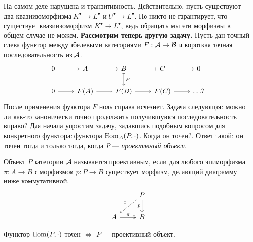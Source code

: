 \documentclass[../hw_main.tex]{subfiles}
\begin{document}
На самом деле нарушена и транзитивность. Действительно, пусть существуют два квазиизоморфизма $K^\bullet \to L^\bullet$ и $U^\bullet \to L^\bullet$. Но никто не гарантирует, что существует квазиизоморфизм $K^\bullet\to L^\bullet$, ведь обращать мы эти морфизмы в общем случае не можем.
\textbf{Рассмотрим теперь другую задачу.} Пусть дан точный слева функтор между абелевыми категориями $F:\mathcal{A} \to \mathcal{B}$ и короткая точная последовательность из $\mathcal{A}$.
\begin{equation*}
\begin{tikzcd}
	0 & A & B & C & 0 \\
	0 & {F(A)} & {F(B)} & {F(C)} & {\ldots ?}
	\arrow[from=1-1, to=1-2]
	\arrow[from=1-2, to=1-3]
	\arrow[from=1-3, to=1-4]
	\arrow[from=1-4, to=1-5]
	\arrow[from=2-1, to=2-2]
	\arrow[from=2-2, to=2-3]
	\arrow[from=2-3, to=2-4]
	\arrow[from=2-4, to=2-5]
	\arrow["F", maps to, from=1-3, to=2-3]
\end{tikzcd}
\end{equation*}
После применения функтора $F$ ноль справа исчезнет. Задача следующая: можно ли как-то канонически точно продолжить получившуюся последовательность вправо?
Для начала упростим задачу, задавшись подобным вопросом для конкретного функтора: функтора $\operatorname{Hom}_{\mathcal{A}}(P, \cdot)$. Когда он точен?. Ответ такой: он точен тогда и только тогда, когда $P$ --- \emph{проективный объект}.
\begin{to_def}
Объект $P$ категории $\mathcal{A}$ называется проективным, если для любого эпиморфизма $\pi: A\to B$ с морфизмом $p:P\to B$ существует морфизм, делающий диаграмму ниже коммутативной.
\begin{equation}\label{projective_def_diagram}
\begin{tikzcd}
	& P \\
	A & B
	\arrow["\pi", two heads, from=2-1, to=2-2]
	\arrow["p"', from=1-2, to=2-2]
	\arrow["\exists"', dashed, from=1-2, to=2-1]
\end{tikzcd}
\end{equation}
\end{to_def}
\begin{to_suj}\label{home_exact_proj}
Функтор $\operatorname{Hom}(P, \cdot)$ точен $\iff$ $P$ --- проективный объект.
\end{to_suj}
\end{document}
